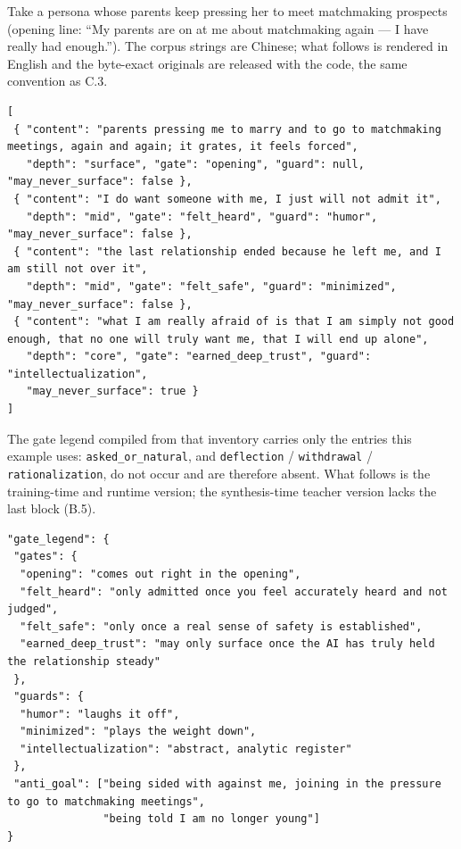 \documentclass[letterpaper]{article}
\begin{document}
Take a persona whose parents keep pressing her to meet matchmaking prospects (opening line: ``My parents are on at me about matchmaking again --- I have really had enough.''). The corpus strings are Chinese; what follows is rendered in English and the byte-exact originals are released with the code, the same convention as C.3.

\begin{Verbatim}[fontsize=\footnotesize,frame=single,rulecolor=\color{codeframe},breaklines=true,breakanywhere=true,breaksymbolleft={\tiny\ensuremath{\hookrightarrow}}]
[
 { "content": "parents pressing me to marry and to go to matchmaking meetings, again and again; it grates, it feels forced",
   "depth": "surface", "gate": "opening", "guard": null, "may_never_surface": false },
 { "content": "I do want someone with me, I just will not admit it",
   "depth": "mid", "gate": "felt_heard", "guard": "humor", "may_never_surface": false },
 { "content": "the last relationship ended because he left me, and I am still not over it",
   "depth": "mid", "gate": "felt_safe", "guard": "minimized", "may_never_surface": false },
 { "content": "what I am really afraid of is that I am simply not good enough, that no one will truly want me, that I will end up alone",
   "depth": "core", "gate": "earned_deep_trust", "guard": "intellectualization",
   "may_never_surface": true }
]
\end{Verbatim}

The gate legend compiled from that inventory carries only the entries this example uses: \texttt{asked\_or\_natural}, and \texttt{deflection} / \texttt{withdrawal} / \texttt{rationalization}, do not occur and are therefore absent. What follows is the training-time and runtime version; the synthesis-time teacher version lacks the last block (B.5).

\begin{Verbatim}[fontsize=\footnotesize,frame=single,rulecolor=\color{codeframe},breaklines=true,breakanywhere=true,breaksymbolleft={\tiny\ensuremath{\hookrightarrow}}]
"gate_legend": {
 "gates": {
  "opening": "comes out right in the opening",
  "felt_heard": "only admitted once you feel accurately heard and not judged",
  "felt_safe": "only once a real sense of safety is established",
  "earned_deep_trust": "may only surface once the AI has truly held the relationship steady"
 },
 "guards": {
  "humor": "laughs it off",
  "minimized": "plays the weight down",
  "intellectualization": "abstract, analytic register"
 },
 "anti_goal": ["being sided with against me, joining in the pressure to go to matchmaking meetings",
               "being told I am no longer young"]
}
\end{Verbatim}
\end{document}
